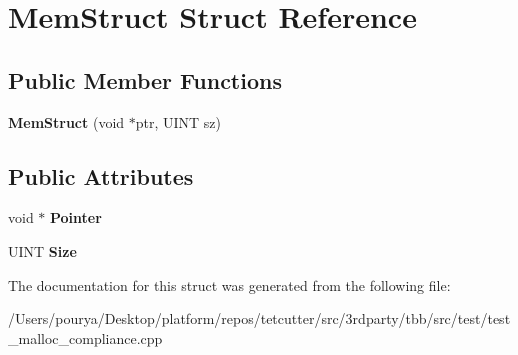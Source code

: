 \hypertarget{structMemStruct}{}\section{Mem\+Struct Struct Reference}
\label{structMemStruct}
\subsection*{Public Member Functions}
\begin{DoxyCompactItemize}
\item 
\hypertarget{structMemStruct_a479cdf41fc02de441bc4a8215535b82d}{}{\bfseries Mem\+Struct} (void $\ast$ptr, U\+I\+N\+T sz)\label{structMemStruct_a479cdf41fc02de441bc4a8215535b82d}

\end{DoxyCompactItemize}
\subsection*{Public Attributes}
\begin{DoxyCompactItemize}
\item 
\hypertarget{structMemStruct_a5ec850183203a898ad92a0b71e97d732}{}void $\ast$ {\bfseries Pointer}\label{structMemStruct_a5ec850183203a898ad92a0b71e97d732}

\item 
\hypertarget{structMemStruct_a0a1d6a8bc89ffa1cfb3c1edb20ef1f64}{}U\+I\+N\+T {\bfseries Size}\label{structMemStruct_a0a1d6a8bc89ffa1cfb3c1edb20ef1f64}

\end{DoxyCompactItemize}


The documentation for this struct was generated from the following file\+:\begin{DoxyCompactItemize}
\item 
/\+Users/pourya/\+Desktop/platform/repos/tetcutter/src/3rdparty/tbb/src/test/test\+\_\+malloc\+\_\+compliance.\+cpp\end{DoxyCompactItemize}
